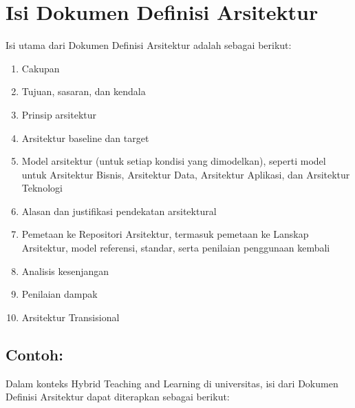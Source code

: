 \section{Isi Dokumen Definisi Arsitektur}
\label{sec:isi_dokumen_definisi_arsitektur}
Isi utama dari Dokumen Definisi Arsitektur adalah sebagai berikut:
\begin{enumerate}
	\item Cakupan
	\item Tujuan, sasaran, dan kendala
	\item Prinsip arsitektur
	\item Arsitektur baseline dan target
	\item Model arsitektur (untuk setiap kondisi yang dimodelkan), seperti model untuk Arsitektur Bisnis, Arsitektur Data, Arsitektur Aplikasi, dan Arsitektur Teknologi
	\item Alasan dan justifikasi pendekatan arsitektural
	\item Pemetaan ke Repositori Arsitektur, termasuk pemetaan ke Lanskap Arsitektur, model referensi, standar, serta penilaian penggunaan kembali
	\item Analisis kesenjangan
	\item Penilaian dampak
	\item Arsitektur Transisional
\end{enumerate}

\subsection{Contoh:}
Dalam konteks Hybrid Teaching and Learning di universitas, isi dari Dokumen Definisi Arsitektur dapat diterapkan sebagai berikut:

